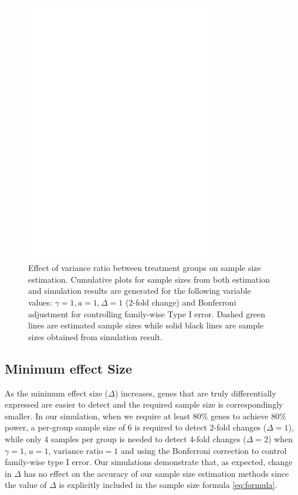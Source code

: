 \documentclass{bioinfo}
\begin{document}
\begin{figure}[h]
  \centerline{\includegraphics*[width=3.2in]{ResVarF.pdf}}
  \caption[Effect of variance ratio between treatment groups on
    sample size estimation] {Effect of variance ratio between
    treatment groups on sample size estimation.  Cumulative plots for
    sample sizes from both estimation and simulation results are
    generated for the following variable values: $\gamma = 1, a = 1,
    \Delta = 1$ (2-fold change) and Bonferroni adjustment for
    controlling family-wise Type I error. Dashed green lines are
    estimated sample sizes while solid black lines are sample
    sizes obtained from simulation result.}  
  \label{fig:ResVar}
\end{figure}

\subsection{Minimum effect Size}

As the minimum effect size ($\Delta$) increases, genes that are
truly differentially expressed are easier to detect and the
required sample size is correspondingly smaller.  In our
simulation, when we require at least 80\% genes to achieve 80\%
power, a per-group sample size of 6 is required to detect 2-fold
changes ($\Delta = 1$), while only 4 samples per group is needed
to detect 4-fold changes ($\Delta = 2$) when $\gamma=1$, $a=1$,
$\text{variance ratio}=1$ and using the Bonferroni correction to
control family-wise type I error. Our simulations demonstrate
that, as expected, change in $\Delta$ has no effect on the
accuracy of our sample size estimation methods since the value of
$\Delta$ is explicitly included in the sample size formula
\ref{eq:formula}.
\end{document}
